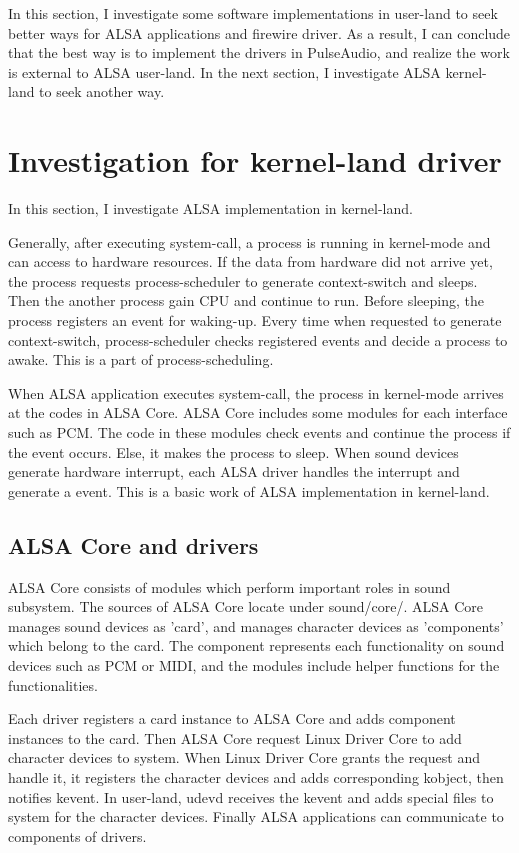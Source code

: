 \documentclass[onecolumn]{article}
\begin{document}
In this section, I investigate some software implementations in user-land to seek better ways for ALSA applications and firewire driver. As a result, I can conclude that the best way is to implement the drivers in PulseAudio, and realize the work is external to ALSA user-land. In the next section, I investigate ALSA kernel-land to seek another way.


\section{Investigation for kernel-land driver}

In this section, I investigate ALSA implementation in kernel-land.

Generally, after executing system-call, a process is running in kernel-mode and can access to hardware resources. If the data from hardware did not arrive yet, the process requests process-scheduler to generate context-switch and sleeps. Then the another process gain CPU and continue to run. Before sleeping, the process registers an event for waking-up. Every time when requested to generate context-switch, process-scheduler checks registered events and decide a process to awake. This is a part of process-scheduling.

When ALSA application executes system-call, the process in kernel-mode arrives at the codes in ALSA Core. ALSA Core includes some modules for each interface such as PCM. The code in these modules check events and continue the process if the event occurs. Else, it makes the process to sleep. When sound devices generate hardware interrupt, each ALSA driver handles the interrupt and generate a event. This is a basic work of ALSA implementation in kernel-land.

\subsection{ALSA Core and drivers}

ALSA Core consists of modules which perform important roles in sound subsystem. The sources of ALSA Core locate under sound/core/. ALSA Core manages sound devices as 'card', and manages character devices as 'components' which belong to the card. The component represents each functionality on sound devices such as PCM or MIDI, and the modules include helper functions for the functionalities.

Each driver registers a card instance to ALSA Core and adds component instances to the card. Then ALSA Core request Linux Driver Core to add character devices to system. When Linux Driver Core grants the request and handle it, it registers the character devices and adds corresponding kobject, then notifies kevent. In user-land, udevd receives the kevent and adds special files to system for the character devices. Finally ALSA applications can communicate to components of drivers.
\end{document}
